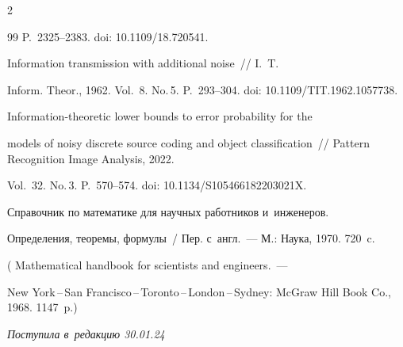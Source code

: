 \begin{multicols}{2}
{{\begin{thebibliography}{99}
P.~2325--2383. doi: 10.1109/18.720541.




 Information transmission with additional noise~// I.~T. 


Inform. Theor., 1962. Vol.~8. No.\,5. P.~293--304. doi: 10.1109/TIT.1962.1057738.




 Information-theoretic lower bounds to error probability for the 


models of noisy discrete source coding and object classification~// Pattern Recognition Image Analysis, 2022. 


Vol.~32. No.\,3. P.~570--574. doi: 10.1134/S105466182203021X.




 Справочник по математике для научных работников и~инженеров. 


Определения, теоремы, формулы~/ Пер. с~англ.~--- М.: Наука, 1970. 720~c.


( {Mathematical handbook for scientists and engineers}.~---  


New York\,--\,San Francisco\,--\,Toronto\,--\,London\,--\,Sydney: McGraw Hill Book Co., 1968. 1147~p.)





\end{thebibliography}





 }


 }





\end{multicols}





\vspace*{-8pt}





\hfill{\small\textit{Поступила в~редакцию 30.01.24}}





\vspace*{6pt}











